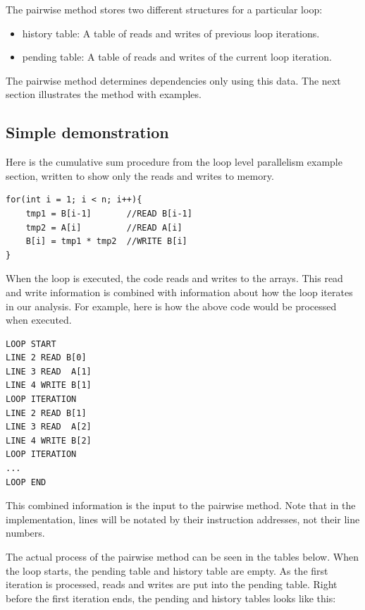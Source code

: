 \documentclass[12pt,twoside]{reedthesis}
\begin{document}
		The pairwise method stores two different structures for a particular loop:
		
		\begin{itemize}
			\item history table: A table of reads and writes of previous loop iterations.
			\item pending table: A table of reads and writes of the current loop iteration.
		\end{itemize}
	
		The pairwise method determines dependencies only using this data. The next section illustrates the method with examples. 
		
		\subsection{Simple demonstration}
		
		
		Here is the cumulative sum procedure from the loop level parallelism example section, written to show only the reads and writes to memory.
			\begin{lstlisting}
for(int i = 1; i < n; i++){
	tmp1 = B[i-1]		//READ B[i-1]
	tmp2 = A[i] 		//READ A[i]
	B[i] = tmp1 * tmp2	//WRITE B[i]
}
			\end{lstlisting}
		
		When the loop is executed, the code reads and writes to the arrays. This read and write information is combined with information about how the loop iterates in our analysis. For example, here is how the above code would be processed when executed. 
		
		\begin{lstlisting}
LOOP START
LINE 2 READ B[0]
LINE 3 READ  A[1]
LINE 4 WRITE B[1]
LOOP ITERATION
LINE 2 READ B[1]
LINE 3 READ  A[2]
LINE 4 WRITE B[2]
LOOP ITERATION
...
LOOP END
		\end{lstlisting}
		
		This combined information is the input to the pairwise method. Note that in the implementation, lines will be notated by their instruction addresses, not their line numbers. 
		
		The actual process of the pairwise method can be seen in the tables below.
		When the loop starts, the pending table and history table are empty. As the first iteration is processed, reads and writes are put into the pending table. Right before the first iteration ends, the pending and history tables looks like this:
		
\end{document}

